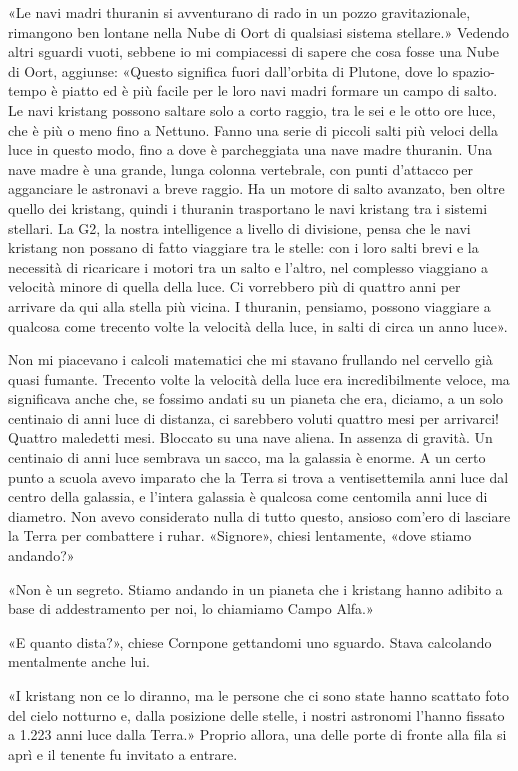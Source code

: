 «Le navi madri thuranin si avventurano di rado in un pozzo
gravitazionale, rimangono ben lontane nella Nube di Oort di qualsiasi
sistema stellare.» Vedendo altri sguardi vuoti, sebbene io mi
compiacessi di sapere che cosa fosse una Nube di Oort, aggiunse: «Questo
significa fuori dall'orbita di Plutone, dove lo spazio-tempo è piatto ed
è più facile per le loro navi madri formare un campo di salto. Le navi
kristang possono saltare solo a corto raggio, tra le sei e le otto ore
luce, che è più o meno fino a Nettuno. Fanno una serie di piccoli salti
più veloci della luce in questo modo, fino a dove è parcheggiata una
nave madre thuranin. Una nave madre è una grande, lunga colonna
vertebrale, con punti d'attacco per agganciare le astronavi a breve
raggio. Ha un motore di salto avanzato, ben oltre quello dei kristang,
quindi i thuranin trasportano le navi kristang tra i sistemi stellari.
La G2, la nostra intelligence a livello di divisione, pensa che le navi
kristang non possano di fatto viaggiare tra le stelle: con i loro salti
brevi e la necessità di ricaricare i motori tra un salto e l'altro, nel
complesso viaggiano a velocità minore di quella della luce. Ci
vorrebbero più di quattro anni per arrivare da qui alla stella più
vicina. I thuranin, pensiamo, possono viaggiare a qualcosa come trecento
volte la velocità della luce, in salti di circa un anno luce».

Non mi piacevano i calcoli matematici che mi stavano frullando nel
cervello già quasi fumante. Trecento volte la velocità della luce era
incredibilmente veloce, ma significava anche che, se fossimo andati su
un pianeta che era, diciamo, a un solo centinaio di anni luce di
distanza, ci sarebbero voluti quattro mesi per arrivarci! Quattro
maledetti mesi. Bloccato su una nave aliena. In assenza di gravità. Un
centinaio di anni luce sembrava un sacco, ma la galassia è enorme. A un
certo punto a scuola avevo imparato che la Terra si trova a
ventisettemila anni luce dal centro della galassia, e l'intera galassia
è qualcosa come centomila anni luce di diametro. Non avevo considerato
nulla di tutto questo, ansioso com'ero di lasciare la Terra per
combattere i ruhar. «Signore», chiesi lentamente, «dove stiamo andando?»

«Non è un segreto. Stiamo andando in un pianeta che i kristang hanno
adibito a base di addestramento per noi, lo chiamiamo Campo Alfa.»

«E quanto dista?», chiese Cornpone gettandomi uno sguardo. Stava
calcolando mentalmente anche lui.

«I kristang non ce lo diranno, ma le persone che ci sono state hanno
scattato foto del cielo notturno e, dalla posizione delle stelle, i
nostri astronomi l'hanno fissato a 1.223 anni luce dalla Terra.» Proprio
allora, una delle porte di fronte alla fila si aprì e il tenente fu
invitato a entrare.

